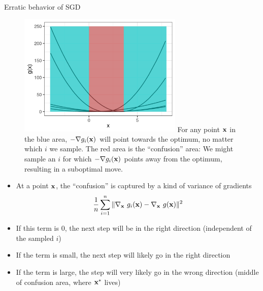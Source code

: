 \documentclass[11pt,compress,t,notes=noshow, xcolor=table]{beamer}
\begin{document}
\begin{vbframe}{Erratic behavior of SGD}

 	\begin{figure}
 		\vspace{-0.3cm}
 		\centering
 		\includegraphics[width = 0.7\textwidth]{figure_man/sgd_example_confusion_areas.png} \newline
		For any point $\mathbf{x}$ in the blue area, $- \nabla g_i(\mathbf{x})$ will point towards the optimum, no matter which $i$ we sample. The red area is the \enquote{confusion} area: We might sample an $i$ for which $- \nabla g_i(\mathbf{x})$ points away from the optimum, resulting in a suboptimal move. 
 	\end{figure}


 	\framebreak 

	\begin{itemize}
		\item At a point $\mathbf{x}$, the \enquote{confusion} is captured by a kind of variance of gradients
		$$
			\frac{1}{n}\sum\limits_{i=1}^n \|\nabla_{\mathbf{x}}~ g_i(\mathbf{x}) - \nabla_{\mathbf{x}} ~ g(\mathbf{x})\|^2
		$$
		\item If this term is $0$, the next step will be in the right direction (independent of the sampled $i$)
		\item If the term is small, the next step will likely go in the right direction
		\item If the term is large, the step will very likely go in the wrong direction (middle of confusion area, where $\mathbf{x}^\ast$ lives)
	\end{itemize}

\end{vbframe}
\end{document}
